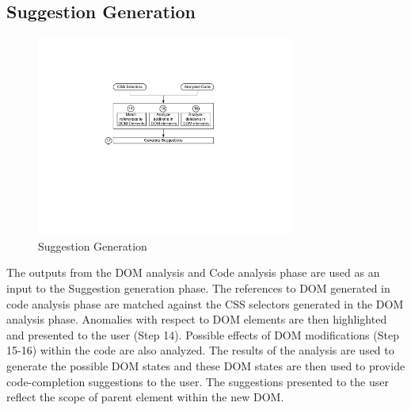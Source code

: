 	\subsection{Suggestion Generation}
	\label{Sec:Suggestions}
		\begin{figure}
			\centering
			\includegraphics[width=85mm]{images/suggestions.pdf}
			\caption{Suggestion Generation}
			\label{Fig:Suggestions}
		\end{figure}
		
		The outputs from the DOM analysis and Code analysis phase are used as an input to the Suggestion generation phase. The references to DOM generated in code analysis phase are matched against the CSS selectors generated in the DOM analysis phase. Anomalies with respect to DOM elements are then highlighted and presented to the user (Step 14). Possible effects of DOM modifications (Step 15-16) within the \javascript code are also analyzed. The results of the analysis are used to generate the possible DOM states and these DOM states are then used to provide code-completion suggestions to the user. The suggestions presented to the user reflect the scope of parent element within the new DOM.
		
		